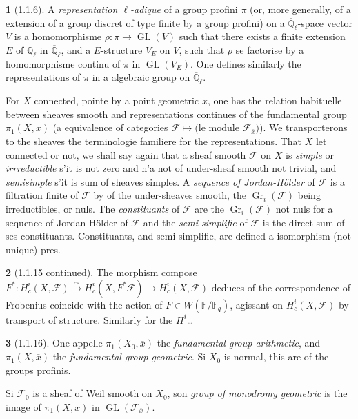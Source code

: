 \documentclass[12pt,a4paper]{article}
\theoremstyle{plain}
\theoremstyle{definition}
\theoremstyle{definition}
\newtheorem{para}{}[section]
\theoremstyle{remark}
\DeclareMathOperator{\GL}{GL}
\DeclareMathOperator{\Gr}{Gr}
\begin{document}
\begin{para}[1.1.6]
A \emph{representation $\ell$-adique} of a group profini $\pi$ (or, more generally, of a extension of a group discret of type finite by a group profini) on a $\overline{\mathbb{Q}}_\ell$-space vector $V$ is a homomorphisme $\rho: \pi \to \GL(V)$ such that there exists a finite extension $E$ of $\mathbb{Q}_\ell$ in $\overline{\mathbb{Q}}_\ell$, and a $E$-structure $V_E$ on $V$, such that $\rho$ se factorise by a homomorphisme continu of $\pi$ in $\GL(V_E)$. One defines similarly the representations of $\pi$ in a algebraic group on $\overline{\mathbb{Q}}_\ell$.

For $X$ connected, pointe by a point geometric $\overline{x}$, one has the relation habituelle between sheaves smooth and representations continues of the fundamental group $\pi_1(X, \overline{x})$ (a equivalence of categories $\mathscr{F} \mapsto \text{(le module } \mathscr{F}_{\overline{x}} \text{)}$). We transporterons to the sheaves the terminologie familiere for the representations. That $X$ let connected or not, we shall say again that a sheaf smooth $\mathscr{F}$ on $X$ is \emph{simple} or \emph{irrreductible} s'it is not zero and n'a not of under-sheaf smooth not trivial, and \emph{semisimple} s'it is sum of sheaves simples. A \emph{sequence of Jordan-H\"older} of $\mathscr{F}$ is a filtration finite of $\mathscr{F}$ by of the under-sheaves smooth, the $\Gr_i(\mathscr{F})$ being irreductibles, or nuls. The \emph{constituants} of $\mathscr{F}$ are the $\Gr_i(\mathscr{F})$ not nuls for a sequence of Jordan-H\"older of $\mathscr{F}$ and the \emph{semi-simplifie} of $\mathscr{F}$ is the direct sum of ses constituants. Constituants, and semi-simplifie, are defined a isomorphism (not unique) pres.
\end{para}

\begin{para}[1.1.15 continued]
The morphism compose $F^*: H_c^i(X, \mathscr{F}) \xrightarrow{\sim} H_c^i(X, F^* \mathscr{F}) \to H_c^i(X, \mathscr{F})$ deduces of the correspondence of Frobenius coincide with the action of $F \in W(\overline{\mathbb{F}}/\mathbb{F}_q)$, agissant on $H_c^i(X, \mathscr{F})$ by transport of structure. Similarly for the $H^i$\ldots
\end{para}

\begin{para}[1.1.16]
One appelle $\pi_1(X_0, \overline{x})$ the \emph{fundamental group arithmetic}, and $\pi_1(X, \overline{x})$ the \emph{fundamental group geometric}. Si $X_0$ is normal, this are of the groups profinis.

Si $\mathscr{F}_0$ is a sheaf of Weil smooth on $X_0$, son \emph{group of monodromy geometric} is the image of $\pi_1(X, \overline{x})$ in $\GL(\mathscr{F}_{\overline{x}})$.
\end{para}
\end{document}
